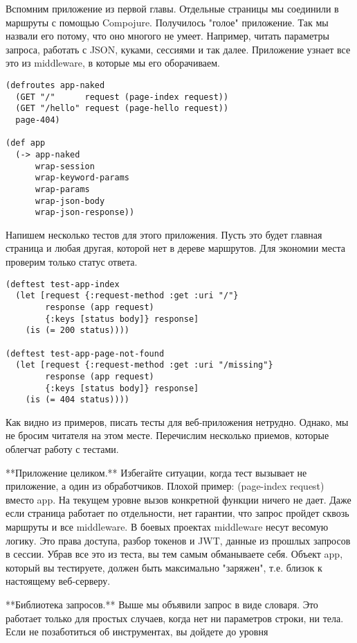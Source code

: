 Вспомним приложение из первой главы. Отдельные страницы мы соединили в маршруты
с помощью Compojure. Получилось "голое" приложение. Так мы назвали его потому,
что оно многого не умеет. Например, читать параметры запроса, работать с JSON,
куками, сессиями и так далее. Приложение узнает все это из middleware, в которые
мы его оборачиваем.

\begin{verbatim}
(defroutes app-naked
  (GET "/"      request (page-index request))
  (GET "/hello" request (page-hello request))
  page-404)

(def app
  (-> app-naked
      wrap-session
      wrap-keyword-params
      wrap-params
      wrap-json-body
      wrap-json-response))
\end{verbatim}

Напишем несколько тестов для этого приложения. Пусть это будет главная страница
и любая другая, которой нет в дереве маршрутов. Для экономии места проверим
только статус ответа.

\begin{verbatim}
(deftest test-app-index
  (let [request {:request-method :get :uri "/"}
        response (app request)
        {:keys [status body]} response]
    (is (= 200 status))))

(deftest test-app-page-not-found
  (let [request {:request-method :get :uri "/missing"}
        response (app request)
        {:keys [status body]} response]
    (is (= 404 status))))
\end{verbatim}

Как видно из примеров, писать тесты для веб-приложения нетрудно. Однако, мы не
бросим читателя на этом месте. Перечислим несколько приемов, которые облегчат
работу с тестами.

**Приложение целиком.** Избегайте ситуации, когда тест вызывает не приложение, а
один из обработчиков. Плохой пример: (page-index request) вместо app. На текущем
уровне вызов конкретной функции ничего не дает. Даже если страница работает по
отдельности, нет гарантии, что запрос пройдет сквозь маршруты и все
middleware. В боевых проектах middleware несут весомую логику. Это права
доступа, разбор токенов и JWT, данные из прошлых запросов в сессии. Убрав все
это из теста, вы тем самым обманываете себя. Объект app, который вы тестируете,
должен быть максимально "заряжен", т.е. близок к настоящему веб-серверу.

**Библиотека запросов.** Выше мы объявили запрос в виде словаря. Это работает
только для простых случаев, когда нет ни параметров строки, ни тела. Если не
позаботиться об инструментах, вы дойдете до уровня

